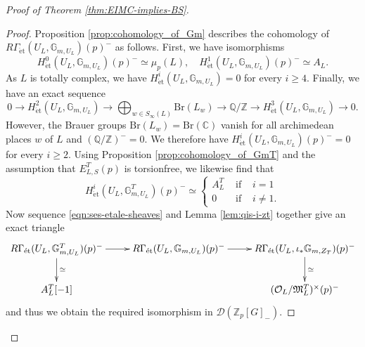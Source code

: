 \documentclass[12pt]{amsart}
\theoremstyle{plain}
\theoremstyle{remark}
\theoremstyle{definition}
\numberwithin{equation}{section}
\begin{document}
{\begin{proof}[Proof of Theorem \ref{thm:EIMC-implies-BS}]
\begin{proof}
Proposition \ref{prop:cohomology_of_Gm} describes the cohomology of $R\Gamma_{\mathrm{\acute{e}t}}(U_{L}, \mathbb{G}_{m,U_{L}})(p)^{-}$ as follows.
First, we have isomorphisms
\[
H^{0}_{\mathrm{\acute{e}t}}(U_{L}, \mathbb{G}_{m,U_{L}})(p)^{-} \simeq \mu_{p}(L), \quad
H^{1}_{\mathrm{\acute{e}t}}(U_{L}, \mathbb{G}_{m,U_{L}})(p)^{-} \simeq A_{L}.
\]
As $L$ is totally complex,
we have $H^{i}_{\mathrm{\acute{e}t}}(U_{L}, \mathbb{G}_{m,U_{L}}) = 0$ for every $i \geq 4$. Finally, we have an exact sequence
\[
0 \longrightarrow H^{2}_{\mathrm{\acute{e}t}}(U_{L}, \mathbb{G}_{m,U_{L}}) \longrightarrow \bigoplus_{w \in S_{\infty}(L)} {\mathrm{Br}}(L_{w}) \longrightarrow {\mathbb{Q}} / {\mathbb{Z}}
\longrightarrow H^{3}_{\mathrm{\acute{e}t}}(U_{L}, \mathbb{G}_{m,U_{L}}) \longrightarrow 0.
\]
However, the Brauer groups ${\mathrm{Br}}(L_{w}) = {\mathrm{Br}}({\mathbb{C}})$ vanish for all archimedean places $w$ of $L$ and $({\mathbb{Q}} / {\mathbb{Z}})^{-} = 0$.
We therefore have $H^{i}_{\mathrm{\acute{e}t}}(U_{L}, \mathbb{G}_{m,U_{L}})(p)^{-} = 0$ for every $i \geq 2$. 
Using Proposition \ref{prop:cohomology_of_GmT} and the assumption that $E_{L,S}^{T}(p)$ is torsionfree,
we likewise find that
\[
H^{i}_{\mathrm{\acute{e}t}}(U_{L}, \mathbb{G}_{m,U_{L}}^{T})(p)^{-} \simeq \left\{ \begin{array}{lll}
A_{L}^{T} & \mbox{ if } & i = 1\\
0 & \mbox{ if } & i \not=1.
\end{array} \right.
\]
Now sequence \eqref{eqn:ses-etale-sheaves} and Lemma \ref{lem:qis-i-zt} together give an exact triangle
\[ \xymatrix{
{R\Gamma_{\mathrm{\acute{e}t}}(U_{L}, \mathbb{G}_{m,U_{L}}^{T})(p)^{-}} \ar[r] \ar[d]^{\simeq} &
R\Gamma_{\mathrm{\acute{e}t}}(U_{L}, \mathbb{G}_{m,U_{L}})(p)^{-} \ar[r] & R\Gamma_{\mathrm{\acute{e}t}}(U_{L}, \iota_{\ast} \mathbb{G}_{m,Z_{T}})(p)^{-} \ar[d]^{\simeq}\\
{A_{L}^{T} [-1]} & & (\mathcal{O}_{L} / \mathfrak{M}_{L}^{T})^{\times}(p)^{-}
}\]
and thus we obtain the required isomorphism in $\mathcal{D}({\mathbb{Z}}_{p}[G]_{-})$.
\end{proof}


\end{proof}}
\end{document}
